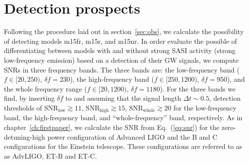 \section{Detection prospects}
Following the procedure laid out in section~\ref{sec:obs}, we calculate the possibility of detecting models m15fr, m15r, and m15nr.
In order evaluate the possible of differentiating between models with and without strong SASI activity (strong low-frequency emission)
based on a detection of their GW signals, we compute SNRs in three frequency bands.
The three bands are: the low-frequency band ($f \in [20,250)$, $\delta f= 230$), the
high-frequency band ($f \in [250,1200)$, $\delta f= 950$), and the whole frequency range
($f \in [20,1200)$,  $\delta f= 1180$).
For the three bands we find, by inserting $\delta f$ to  and assuming that the
signal length $\Delta t \sim 0.5$, detection thresholds of $\mathrm{SNR}_\mathrm{low} \gtrsim 11$, 
$\mathrm{SNR}_\mathrm{high} \gtrsim 15$, $\mathrm{SNR}_\mathrm{whole} \gtrsim 20$ for the
low-frequency band, the high-frequency band, and ``whole-frequency'' band, respectively.
As in chapter~\ref{ch:firstpaper}, we calculate the SNR from Eq.~(\ref{eq:snr}) for the zero-detuning-high power configuration
of Advanced LIGO \citep{adv_sens} and the B \citep{et_b} and C \citep{et_c} configurations for the Einstein
telescope. These configurations are referred to as as AdvLIGO, ET-B and ET-C.
